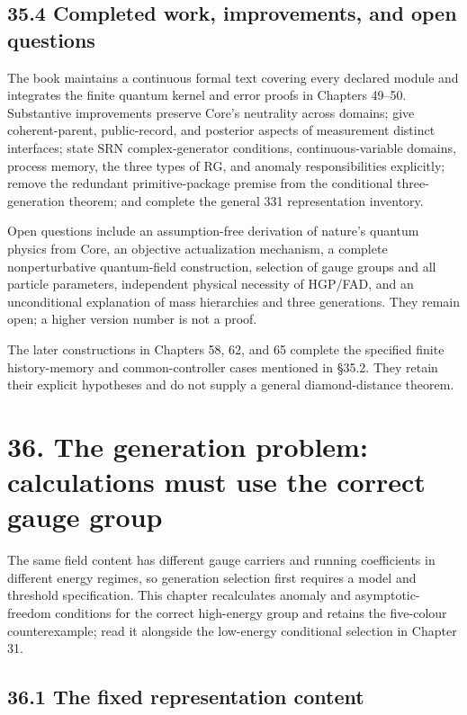 \documentclass[
  11pt,
  oneside]{book}
\begin{document}
\section{35.4 Completed work, improvements, and open questions}

The book maintains a continuous formal text covering every declared
module and integrates the finite quantum kernel and error proofs in
Chapters 49--50. Substantive improvements preserve Core's neutrality
across domains; give coherent-parent, public-record, and posterior
aspects of measurement distinct interfaces; state SRN complex-generator
conditions, continuous-variable domains, process memory, the three types
of RG, and anomaly responsibilities explicitly; remove the redundant
primitive-package premise from the conditional three-generation theorem;
and complete the general 331 representation inventory.

Open questions include an assumption-free derivation of nature's quantum
physics from Core, an objective actualization mechanism, a complete
nonperturbative quantum-field construction, selection of gauge groups
and all particle parameters, independent physical necessity of HGP/FAD,
and an unconditional explanation of mass hierarchies and three
generations. They remain open; a higher version number is not a proof.

The later constructions in Chapters 58, 62, and 65 complete the
specified finite history-memory and common-controller cases mentioned in
§35.2. They retain their explicit hypotheses and do not supply a general
diamond-distance theorem.

\chapter{36. The generation problem: calculations must use the correct
gauge group}\label{ch-36}

The same field content has different gauge carriers and running
coefficients in different energy regimes, so generation selection first
requires a model and threshold specification. This chapter recalculates
anomaly and asymptotic-freedom conditions for the correct high-energy
group and retains the five-colour counterexample; read it alongside the
low-energy conditional selection in Chapter 31.

\section{36.1 The fixed representation content}
\end{document}
